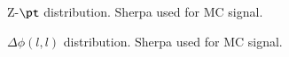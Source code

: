 \begin{figure}[h!tbp]
	\centering
	\hfill
	\caption{Z-$\pt$ distribution. Sherpa used for MC signal.}
	\label{AFig8S}
\end{figure} 

\begin{figure}[h!tbp]
	\centering
	\hfill
	\caption{$\Delta\phi (l,l)$ distribution. Sherpa used for MC signal.}
	\label{AFig9S}
\end{figure} 

